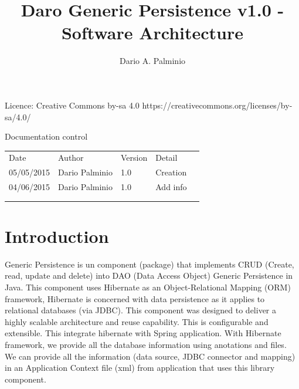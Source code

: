 \documentclass[a4paper,11pt]{book}
\title{Daro Generic Persistence v1.0 - Software Architecture}
\author{Dario A. Palminio}
\begin{document}
\maketitle
Licence: Creative Commons by-sa 4.0
\newline
https://creativecommons.org/licenses/by-sa/4.0/
\newline

Documentation control

\begin{table}[h]
\begin{tabular}{lllll}
\cline{1-4}
\multicolumn{1}{|l|}{Date}       & \multicolumn{1}{l|}{Author}         & \multicolumn{1}{l|}{Version} & \multicolumn{1}{l|}{Detail}   &  \\ \cline{1-4}
\multicolumn{1}{|l|}{05/05/2015} & \multicolumn{1}{l|}{Dario Palminio} & \multicolumn{1}{l|}{1.0}     & \multicolumn{1}{l|}{Creation} &  \\ \cline{1-4}
\multicolumn{1}{|l|}{04/06/2015} & \multicolumn{1}{l|}{Dario Palminio} & \multicolumn{1}{l|}{1.0}     & \multicolumn{1}{l|}{Add info} &  \\ \cline{1-4}
                                 &                                     &                              &                               &  \\
                                 &                                     &                              &                               & 
\end{tabular}
\end{table}

\tableofcontents

\chapter{Introduction}
Generic Persistence is un component (package) that implements CRUD (Create, read, update and delete) into DAO (Data Access Object) Generic Persistence in Java. This component uses Hibernate as an Object-Relational Mapping (ORM) framework, Hibernate is concerned with data persistence as it applies to relational databases (via JDBC). This component was designed to deliver a highly scalable architecture and reuse capability. This is configurable and extensible. This integrate hibernate with Spring application. With Hibernate framework, we provide all the database information using anotations and files. We can provide all the information (data source, JDBC connector and mapping) in an Application Context file (xml) from application that uses this library component.
\end{document}

